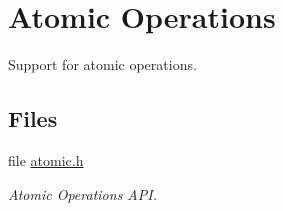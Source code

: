 \hypertarget{group__RTEMSScoreAtomic}{}\section{Atomic Operations}
\label{group__RTEMSScoreAtomic}


Support for atomic operations.  


\subsection*{Files}
\begin{DoxyCompactItemize}
\item 
file \mbox{\hyperlink{include_2rtems_2score_2atomic_8h}{atomic.\+h}}
\begin{DoxyCompactList}\small\item\em Atomic Operations A\+PI. \end{DoxyCompactList}\end{DoxyCompactItemize}
